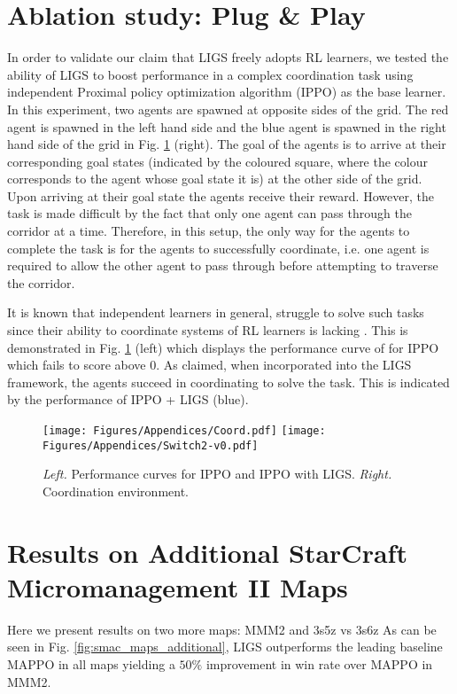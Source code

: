 \documentclass{article}
\begin{document}
\section{Ablation study: Plug \& Play}\label{sec:plug_n_play}
In order to validate our claim that LIGS freely adopts RL learners, we tested the ability of LIGS to boost performance in a complex coordination task using independent Proximal policy optimization algorithm (IPPO) \cite{schulman2017Proximal} as the base learner. In this experiment, two agents are spawned at opposite sides of the grid. The red agent is spawned in the left hand side and the blue agent is spawned in the right hand side of the grid in Fig. \ref{fig:my_label} (right). The goal of the agents is to arrive at their corresponding goal states (indicated by the coloured square, where the colour corresponds to the agent whose goal state it is) at the other side of the grid. Upon arriving at their goal state the agents receive their reward. However, the task is made difficult by the fact that only one agent can pass through the corridor at a time. Therefore, in this setup, the only way for the agents to complete the task is for the agents to successfully coordinate, i.e. one agent is required to allow the other agent to pass through before attempting to traverse the corridor. 

It is known that independent learners in general, struggle to solve such tasks since their ability to coordinate systems of RL learners is lacking \cite{yang2020multi}.  This is demonstrated in Fig. \ref{fig:my_label} (left) which displays the performance curve of for IPPO which fails to score above $0$. As claimed, when incorporated into the LIGS framework, the agents succeed in coordinating to solve the task. This is indicated by the performance of IPPO + LIGS (blue).  

\begin{figure}[h!]
    \centering
\texttt{[image: Figures/Appendices/Coord.pdf]}
\vspace{3mm}\hspace{10 mm}
    \texttt{[image: Figures/Appendices/Switch2-v0.pdf]}
    \caption{\textit{Left.} Performance curves for IPPO and IPPO with LIGS. \textit{Right.} Coordination environment.  }
    \label{fig:my_label}
\end{figure}
\newpage
\section{Results on Additional StarCraft Micromanagement II Maps}
Here we present results on two more maps: MMM2 and 3s5z vs 3s6z  As can be seen in Fig. \ref{fig:smac_maps_additional}, LIGS outperforms the leading baseline MAPPO in all maps yielding a $50\%$ improvement in win rate over MAPPO in MMM2.
\end{document}
